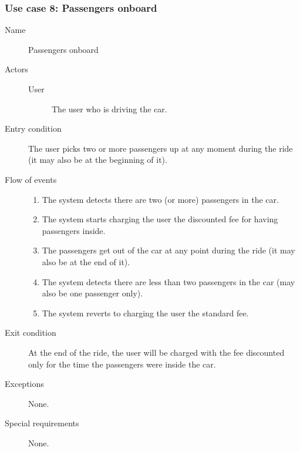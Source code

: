 	\subsubsection{Use case 8: Passengers onboard}
		\begin{description}
			\item[Name] Passengers onboard
			\item[Actors]\hfill
				\begin{description}
					\item[User] The user who is driving the car.
				\end{description}
			\item[Entry condition] The user picks two or more passengers up at any moment during the ride (it may also be at the beginning of it).
			\item[Flow of events]\hfill
				\begin{enumerate}
					\item The system detects there are two (or more) passengers in the car.
					\item The system starts charging the user the discounted fee for having passengers inside.
					\item The passengers get out of the car at any point during the ride (it may also be at the end of it). 
					\item The system detects there are less than two passengers in the car (may also be one passenger only). 
					\item The system reverts to charging the user the standard fee.
				\end{enumerate}
			\item[Exit condition] At the end of the ride, the user will be charged with the fee discounted only for the time the passengers were inside the car.
			\item[Exceptions] None.
			\item[Special requirements] None.
		\end{description}
	
